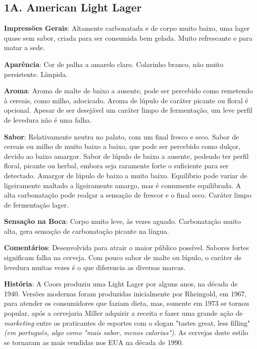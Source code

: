 \subsection*{1A. American Light Lager}
\textbf{Impressões Gerais}: Altamente carbonatada e de corpo muito baixo, uma lager quase sem sabor, criada para ser consumida bem gelada. Muito refrescante e para matar a sede.

\textbf{Aparência}: Cor de palha a amarelo claro. Colarinho branco, não muito persistente. Límpida.

\textbf{Aroma}: Aroma de malte de baixo a ausente, pode ser percebido como remetendo à cereais, como milho, adocicado. Aroma de lúpulo de caráter picante ou floral é opcional. Apesar de ser desejável um caráter limpo de fermentação, um leve perfil de levedura não é uma falha.

\textbf{Sabor}: Relativamente neutra no palato, com um final fresco e seco. Sabor de cereais ou milho de muito baixo a baixo, que pode ser percebido como dulçor, devido ao baixo amargor. Sabor de lúpulo de baixo a ausente, podendo ter perfil floral, picante ou herbal, embora seja raramente forte o suficiente para ser detectado. Amargor de lúpulo de baixo a muito baixo. Equilíbrio pode variar de ligeiramente maltado a ligeiramente amargo, mas é comumente equilibrada. A alta carbonatação pode realçar a sensação de frescor e o final seco. Caráter limpo de fermentação lager.

\textbf{Sensação na Boca}: Corpo muito leve, às vezes aguado. Carbonatação muito alta, gera sensação de carbonatação picante na língua.

\textbf{Comentários}: Desenvolvida para atrair o maior público possível. Sabores fortes significam falha na cerveja. Com pouco sabor de malte ou lúpulo, o caráter de levedura muitas vezes é o que diferencia as diversas marcas.

\textbf{História}: A Coors produziu uma Light Lager por alguns anos, na década de 1940. Versões modernas foram produzidas inicialmente por Rheingold, em 1967, para atender os consumidores que faziam dieta, mas, somente em 1973 se tornou popular, após a cervejaria Miller adquirir a receita e fazer uma grande ação de \textit{marketing} entre os praticantes de esportes com o slogan "tastes great, less filling" \textit{(em português, algo como "mais sabor, menos calorias")}. As cervejas deste estilo se tornaram as mais vendidas nos EUA na década de 1990.

